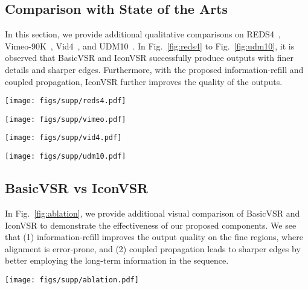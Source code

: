 \documentclass[final]{cvpr}
\begin{document}
\subsection{Comparison with State of the Arts}
In this section, we provide additional qualitative comparisons on REDS4~\cite{nah2019ntire}, Vimeo-90K~\cite{xue2019video}, Vid4~\cite{liu2014bayesian}, and UDM10~\cite{yi2019progressive}. In Fig.~\ref{fig:reds4} to Fig.~\ref{fig:udm10}, it is observed that BasicVSR and IconVSR successfully produce outputs with finer details and sharper edges. Furthermore, with the proposed information-refill and coupled propagation, IconVSR further improves the quality of the outputs.
\begin{figure*}[!t]
\begin{center}
		\texttt{[image: figs/supp/reds4.pdf]}
		\caption{Qualitative comparison on REDS~\cite{nah2019ntire}.}
\label{fig:reds4}
	\end{center}
\end{figure*}
\begin{figure*}[!t]
\begin{center}
		\texttt{[image: figs/supp/vimeo.pdf]}
		\caption{Qualitative comparison on Vimeo-90K~\cite{xue2019video}.}
\label{fig:vimeo}
	\end{center}
\end{figure*}
\begin{figure*}[!t]
\begin{center}
		\texttt{[image: figs/supp/vid4.pdf]}
		\caption{Qualitative comparison on Vid4~\cite{liu2014bayesian}.}
\label{fig:vid4}
	\end{center}
\end{figure*}
\begin{figure*}[!t]
\begin{center}
		\texttt{[image: figs/supp/udm10.pdf]}
		\caption{Qualitative comparison on UDM10~\cite{yi2019progressive}.}
\label{fig:udm10}
	\end{center}
\end{figure*}
\subsection{BasicVSR vs IconVSR}
In Fig.~\ref{fig:ablation}, we provide additional visual comparison of BasicVSR and IconVSR to demonstrate the effectiveness of our proposed components. We see that (1) information-refill improves the output quality on the fine regions, where alignment is error-prone, and (2) coupled propagation leads to sharper edges by better employing the long-term information in the sequence.
\begin{figure*}[!t]
\begin{center}
		\texttt{[image: figs/supp/ablation.pdf]}
		\caption{\textbf{Ablation of IconVSR.} With \textit{information-refill} and \textit{coupled propagation}, IconVSR produces outputs with details and sharper edges.}
\label{fig:ablation}
	\end{center}
\end{figure*}
 
\end{document}

